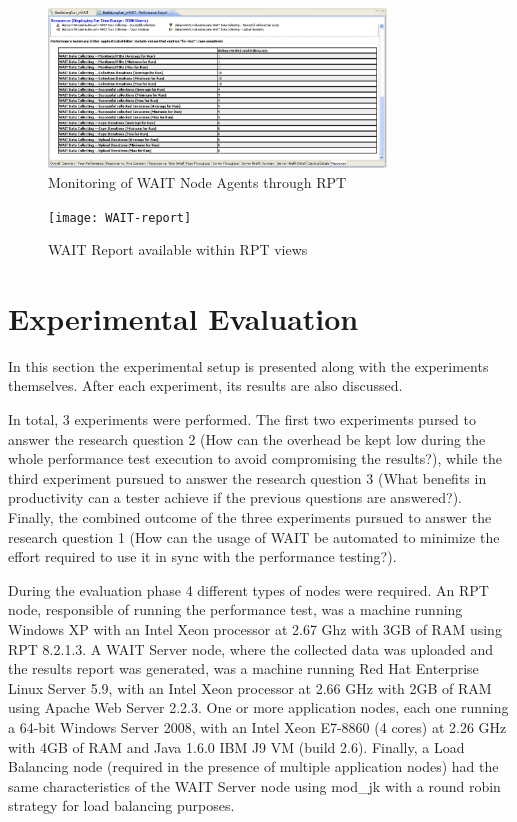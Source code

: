 \documentclass[runningheads,a4paper]{llncs}
\begin{document}
\begin{figure}[!h]
\centering
\includegraphics[totalheight=.3\textheight,width=0.8\textwidth]{WAIT-monitoring}
\caption{Monitoring of WAIT Node Agents through RPT}
\label{fig_mon}
\end{figure}

\begin{figure}[!h]
\centering
\texttt{[image: WAIT-report]}
\caption{WAIT Report available within RPT views}
\label{fig_report}
\end{figure}



\section{Experimental Evaluation}

In this section the experimental setup is presented along with the experiments themselves. 
After each experiment, its results are also discussed.

In total, 3 experiments were performed. The first two experiments pursed to
answer the research question 2 (How can the overhead be kept low during the whole 
performance test execution to avoid compromising the results?), while the third experiment
pursued to answer the research question 3 (What benefits in productivity can a tester 
achieve if the previous questions are answered?). Finally, the combined outcome
of the three experiments pursued to answer the research question 1 (How can the usage 
of WAIT be automated to minimize the effort required to use it in sync with the performance testing?).

During the evaluation phase 4 different types of nodes were required. An RPT
node, responsible of running the performance test, was a machine running Windows
XP with an Intel Xeon processor at 2.67 Ghz with 3GB of RAM using RPT 8.2.1.3.
A WAIT Server node, where the collected data was uploaded and the results
report was generated, was a machine running Red Hat Enterprise Linux Server 5.9,
with an Intel Xeon processor at 2.66 GHz with 2GB of RAM using Apache Web Server 2.2.3.
One or more application nodes, each one running a 64-bit Windows Server 2008,
with an Intel Xeon E7-8860 (4 cores) at 2.26 GHz with 4GB of RAM and Java 1.6.0
IBM J9 VM (build 2.6). Finally, a Load Balancing node (required in the presence
of multiple application nodes) had the same characteristics of the WAIT Server node using
mod\_jk with a round robin strategy for load balancing purposes.
\end{document}
